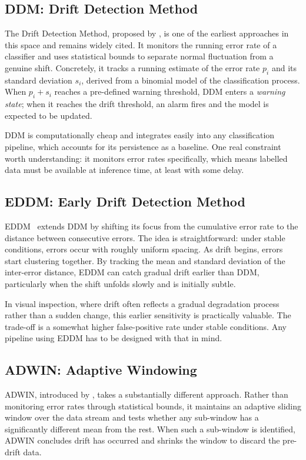 \subsection{DDM: Drift Detection Method}

The Drift Detection Method, proposed by \textcite{Gama2004}, is one of the earliest approaches in this space and remains widely cited. It monitors the running error rate of a classifier and uses statistical bounds to separate normal fluctuation from a genuine shift. Concretely, it tracks a running estimate of the error rate $p_i$ and its standard deviation $s_i$, derived from a binomial model of the classification process. When $p_i + s_i$ reaches a pre-defined warning threshold, DDM enters a \textit{warning state}; when it reaches the drift threshold, an alarm fires and the model is expected to be updated.

DDM is computationally cheap and integrates easily into any classification pipeline, which accounts for its persistence as a baseline. One real constraint worth understanding: it monitors error rates specifically, which means labelled data must be available at inference time, at least with some delay.

\subsection{EDDM: Early Drift Detection Method}

EDDM~\autocite{baena2006early} extends DDM by shifting its focus from the cumulative error rate to the distance between consecutive errors. The idea is straightforward: under stable conditions, errors occur with roughly uniform spacing. As drift begins, errors start clustering together. By tracking the mean and standard deviation of the inter-error distance, EDDM can catch gradual drift earlier than DDM, particularly when the shift unfolds slowly and is initially subtle.

In visual inspection, where drift often reflects a gradual degradation process rather than a sudden change, this earlier sensitivity is practically valuable. The trade-off is a somewhat higher false-positive rate under stable conditions. Any pipeline using EDDM has to be designed with that in mind.

\subsection{ADWIN: Adaptive Windowing}

ADWIN, introduced by \textcite{Bifet2007}, takes a substantially different approach. Rather than monitoring error rates through statistical bounds, it maintains an adaptive sliding window over the data stream and tests whether any sub-window has a significantly different mean from the rest. When such a sub-window is identified, ADWIN concludes drift has occurred and shrinks the window to discard the pre-drift data.

